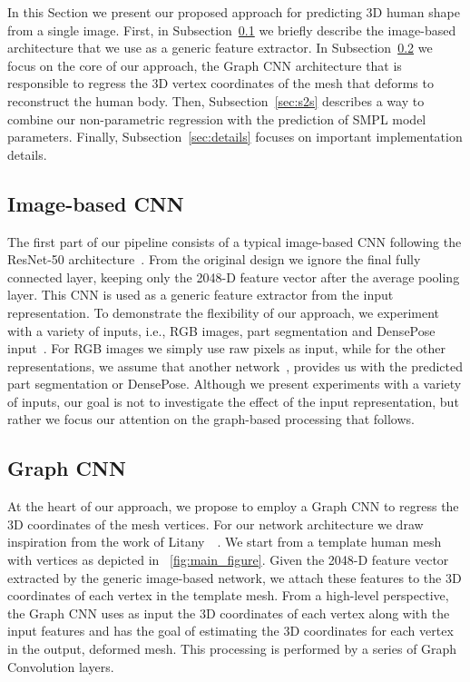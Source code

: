 In this Section we present our proposed approach for predicting 3D human shape from a single image.  First, in Subsection~\ref{sec:image_cnn} we briefly describe the image-based architecture that we use as a generic feature extractor. In Subsection~\ref{sec:graph_cnn} we focus on the core of our approach, the Graph CNN architecture that is responsible to regress the 3D vertex coordinates of the mesh that deforms to reconstruct the human body. Then, Subsection~\ref{sec:s2s} describes a way to combine our non-parametric regression with the prediction of SMPL model parameters. Finally, Subsection~\ref{sec:details} focuses on important implementation details.

\subsection{Image-based CNN}\label{sec:image_cnn}
The first part of our pipeline consists of a typical image-based CNN following the ResNet-50 architecture~\cite{he2016resnet}. From the original design we ignore the final fully connected layer, keeping only the 2048-D feature vector after the average pooling layer. This CNN is used as a generic feature extractor from the input representation. To demonstrate the flexibility of our approach, we experiment with a variety of inputs, i.e., RGB images, part segmentation and DensePose input~\cite{guler2018densepose}. For RGB images we simply use raw pixels as input, while for the other representations, we assume that another network~\cite{guler2018densepose}, provides us with the predicted part segmentation or DensePose. Although we present experiments with a variety of inputs, our goal is not to investigate the effect of the input representation, but rather we focus our attention on the graph-based processing that follows.

\subsection{Graph CNN}\label{sec:graph_cnn}
At the heart of our approach, we propose to employ a Graph CNN to regress the 3D coordinates of the mesh vertices. For our network architecture we draw inspiration from the work of Litany~\etal~\cite{litany2017deformable}. We start from a template human mesh with  vertices as depicted in \figurename~\ref{fig:main_figure}. Given the 2048-D feature vector extracted by the generic image-based network, we attach these features to the 3D coordinates of each vertex in the template mesh. From a high-level perspective, the Graph CNN uses as input the 3D coordinates of each vertex along with the input features and has the goal of estimating the 3D coordinates for each vertex in the output, deformed mesh. This processing is performed by a series of Graph Convolution layers.

